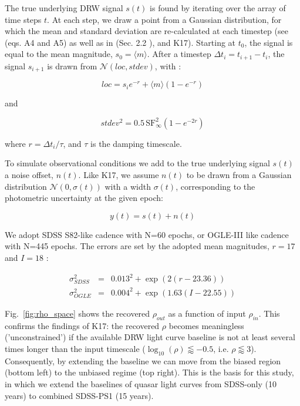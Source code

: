 \documentclass[twocolumn]{aastex62}
\begin{document}
The true underlying DRW signal $s(t)$ is found by iterating over the array of time steps $t$.  At each step, we draw a point from a Gaussian distribution, for which the mean and standard deviation are re-calculated at each timestep (see \citealt{kelly2009} (eqs. A4 and A5) as well as in \cite{macleod2010} (Sec. 2.2 ), and K17). Starting at $t_{0}$, the signal is equal to the mean magnitude, $s_{0} = \langle m \rangle$. After a timestep $\Delta t_{i} = t_{i+1} - t_{i}$, the signal $s_{i+1}$ is drawn from  $\mathcal{N}(loc, stdev)$, with : 

\begin{equation}
loc = s_{i} e ^ { - r  }  + \langle m \rangle \left( 1 - e ^{ - r }\right)
\end{equation}

and 

\begin{equation}
stdev^{2} =  0.5  \, \mathrm{SF}_{\infty}^{2} \left( 1 - e ^{  - 2 r  }  \right)
\end{equation}

where  $r = \Delta t_{i} / \tau$, and $\tau$ is the damping timescale.


To simulate observational conditions  we add to the true underlying signal  $s(t)$ a noise offset, $n(t)$.  Like K17,  we assume $n(t)$ to be drawn from a Gaussian distribution $\mathcal{N}(0,\sigma(t))$ with a width $\sigma(t)$, corresponding to the  photometric uncertainty at the given epoch: 

\begin{equation}
y(t) = s(t) + n(t) 
\end{equation}



We adopt SDSS S82-like cadence with N=60 epochs, or OGLE-III like cadence with N=445 epochs.  The errors are set by the adopted mean magnitudes, $r=17$ and $I=18$ :

\begin{eqnarray}
\sigma_{SDSS}^{2} &=& 0.013^{2} + \exp{(2 (r-23.36))} \\
\sigma_{OGLE}^{2} &=& 0.004^{2} + \exp{(1.63 (I - 22.55))}
\end{eqnarray}



Fig.~\ref{fig:rho_space} shows the recovered $\rho_{out}$ as a function of input $\rho_{in}$. This confirms the findings of K17: the recovered $\rho$ becomes meaningless ('unconstrained') if the available DRW light curve baseline is not at least several times longer than the input timescale ($\log_{10}{(\rho)} \lessapprox -0.5$, i.e. $\rho \lessapprox 3 $). Consequently, by extending the baseline we can move from the biased region (bottom left) to the unbiased regime (top right). This is the basis for this study,  in which we extend the baselines of quasar light curves from SDSS-only (10 years) to combined SDSS-PS1 (15 years). 
\end{document}
